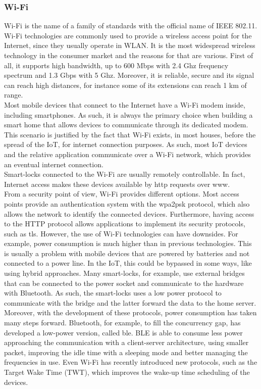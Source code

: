 \subsubsection{Wi-Fi}
Wi-Fi is the name of a family of standards with the official name of IEEE 802.11. Wi-Fi technologies are commonly used to provide a wireless access point for the Internet, since they usually operate in WLAN. It is the most widespread wireless technology in the consumer market and the reasons for that are various. First of all, it supports high bandwidth, up to 600 Mbps with 2.4 Ghz frequency spectrum and 1.3 Gbps with 5 Ghz. Moreover, it is reliable, secure and its signal can reach high distances, for instance some of its extensions can reach 1 km of range. 
\\ Most mobile devices that connect to the Internet have a Wi-Fi modem inside, including smartphones. As such, it is always the primary choice when building a smart home that allows devices to communicate through its dedicated modem. This scenario is justified by the fact that Wi-Fi exists, in most houses, before the spread of the IoT, for internet connection purposes. As such, most IoT devices and the relative application communicate over a Wi-Fi network, which provides an eventual internet connection. 
\\ Smart-locks connected to the Wi-Fi are usually remotely controllable. In fact, Internet access makes these devices available by \acrshort{http} requests over \acrshort{www}.
\\ From a security point of view, Wi-Fi provides different options. Most access points provide an authentication system with the \acrshort{wpa2psk} protocol, which also allows the network to identify the connected devices. Furthermore, having access to the HTTP protocol allows applications to implement its security protocols, such as \gls{tls}. 
However, the use of Wi-Fi technologies can have downsides. For example, power consumption is much higher than in previous technologies. This is usually a problem with mobile devices that are powered by batteries and not connected to a power line. In the IoT, this could be bypassed in some ways, like using hybrid approaches. Many smart-locks, for example, use external bridges that can be connected to the power socket and communicate to the hardware with Bluetooth. As such, the smart-locks uses a low power protocol to communicate with the bridge and the latter forward the data to the home server. Moreover, with the development of these protocols, power consumption has taken many steps forward. Bluetooth, for example, to fill the concurrency gap, has developed a low-power version, called \gls{ble}. BLE is able to consume less power approaching the communication with a client-server architecture, using smaller packet, improving the idle time with a sleeping mode and better managing the frequencies in use. Even Wi-Fi has recently introduced new protocols, such as the Target Wake Time (TWT), which improves the wake-up time scheduling of the devices.
